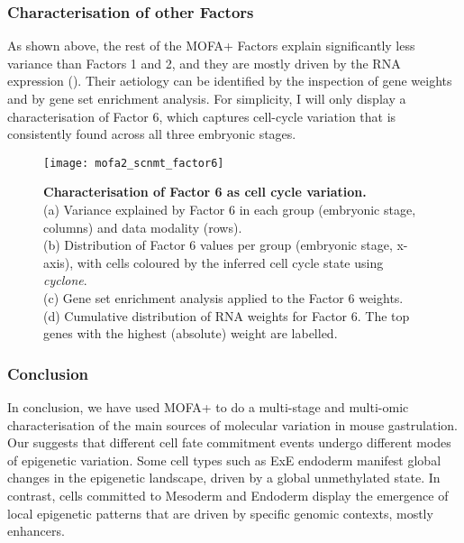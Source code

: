 \subsubsection{Characterisation of other Factors}

As shown above, the rest of the MOFA+ Factors explain significantly less variance than Factors 1 and 2, and they are mostly driven by the RNA expression (). Their aetiology can be identified by the inspection of gene weights and by gene set enrichment analysis. For simplicity, I will only display a characterisation of Factor 6, which captures cell-cycle variation that is consistently found across all three embryonic stages.

\begin{figure}[H]
	\centering
	\texttt{[image: mofa2\_scnmt\_factor6]}
	\caption[]{
	\textbf{Characterisation of Factor 6 as cell cycle variation.} \\
	(a) Variance explained by Factor 6 in each group (embryonic stage, columns) and data modality (rows).\\
	(b) Distribution of Factor 6 values per group (embryonic stage, x-axis), with cells coloured by the inferred cell cycle state using \textit{cyclone}.\\
	(c) Gene set enrichment analysis applied to the Factor 6 weights.\\
	(d) Cumulative distribution of RNA weights for Factor 6. The top genes with the highest (absolute) weight are labelled.
	}
	\label{fig:mofa2_scnmt_factor6}
\end{figure}

\subsubsection{Conclusion}

In conclusion, we have used MOFA+ to do a multi-stage and multi-omic characterisation of the main sources of molecular variation in mouse gastrulation. Our suggests that different cell fate commitment events undergo different modes of epigenetic variation. Some cell types such as ExE endoderm manifest global changes in the epigenetic landscape, driven by a global unmethylated state. In contrast, cells committed to Mesoderm and Endoderm display the emergence of local epigenetic patterns that are driven by specific genomic contexts, mostly enhancers.

